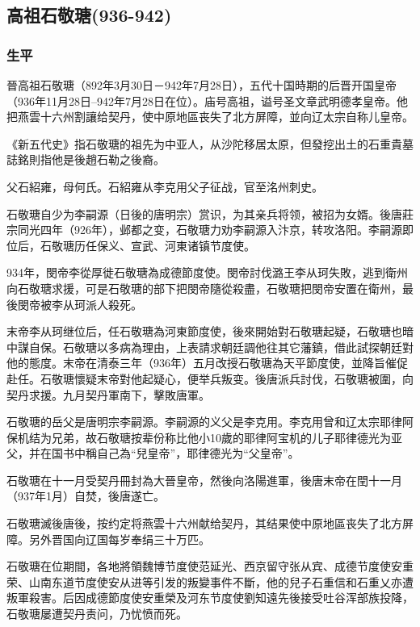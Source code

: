 
\subsection{高祖石敬瑭\tiny(936-942)}

\subsubsection{生平}

晉高祖石敬瑭（892年3月30日－942年7月28日），五代十国時期的后晋开国皇帝（936年11月28日–942年7月28日在位）。庙号高祖，谥号圣文章武明德孝皇帝。他把燕雲十六州割讓给契丹，使中原地區丧失了北方屏障，並向辽太宗自称儿皇帝。

《新五代史》指石敬瑭的祖先为中亚人，从沙陀移居太原，但發挖出土的石重貴墓誌銘則指他是後趙石勒之後裔。

父石紹雍，母何氏。石紹雍从李克用父子征战，官至洺州刺史。

石敬瑭自少为李嗣源（日後的唐明宗）赏识，为其亲兵将领，被招为女婿。後唐莊宗同光四年（926年），邺都之变，石敬瑭力劝李嗣源入汴京，转攻洛阳。李嗣源即位后，石敬瑭历任保义、宣武、河東诸镇节度使。

934年，閔帝李從厚徙石敬瑭為成德節度使。閔帝討伐潞王李从珂失敗，逃到衛州向石敬瑭求援，可是石敬瑭的部下把閔帝隨從殺盡，石敬瑭把閔帝安置在衛州，最後閔帝被李从珂派人殺死。

末帝李从珂继位后，任石敬瑭為河東節度使，後來開始對石敬瑭起疑，石敬瑭也暗中謀自保。石敬瑭以多病為理由，上表請求朝廷調他往其它藩鎮，借此試探朝廷對他的態度。末帝在清泰三年（936年）五月改授石敬瑭為天平節度使，並降旨催促赴任。石敬瑭懷疑末帝對他起疑心，便举兵叛变。後唐派兵討伐，石敬瑭被圍，向契丹求援。九月契丹軍南下，擊敗唐軍。

石敬瑭的岳父是唐明宗李嗣源。李嗣源的义父是李克用。李克用曾和辽太宗耶律阿保机结为兄弟，故石敬瑭按辈份称比他小10歲的耶律阿宝机的儿子耶律德光为亚父，并在国书中稱自己為“兒皇帝”，耶律德光为“父皇帝”。

石敬瑭在十一月受契丹冊封為大晉皇帝，然後向洛陽進軍，後唐末帝在閏十一月（937年1月）自焚，後唐遂亡。

石敬瑭滅後唐後，按约定将燕雲十六州献给契丹，其结果使中原地區丧失了北方屏障。另外晋国向辽国每岁奉绢三十万匹。

石敬瑭在位期間，各地將領魏博节度使范延光、西京留守张从宾、成德节度使安重荣、山南东道节度使安从进等引发的叛變事件不斷，他的兒子石重信和石重乂亦遭叛軍殺害。后因成德節度使安重榮及河东节度使劉知遠先後接受吐谷浑部族投降，石敬瑭屡遭契丹责问，乃忧愤而死。

